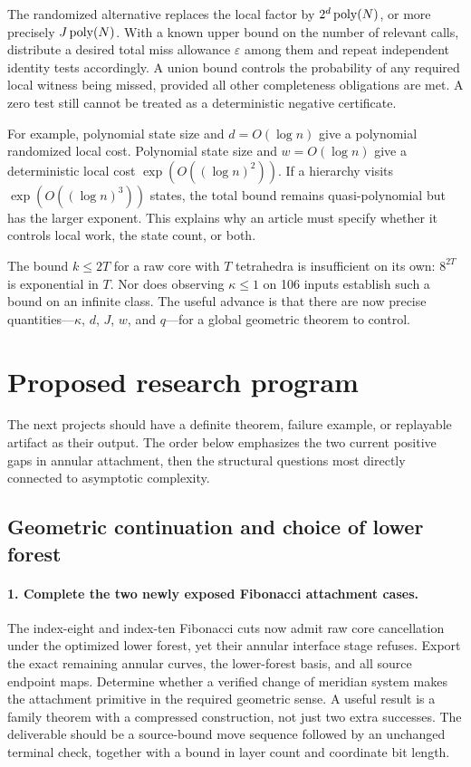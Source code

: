 The randomized alternative replaces the local factor by
$2^d\operatorname{poly}(N)$, or more precisely $J\operatorname{poly}(N)$.  With a known upper bound
on the number of relevant calls, distribute a desired total miss allowance
$\varepsilon$ among them and repeat independent identity tests accordingly.
A union bound controls the probability of any required local witness being
missed, provided all other completeness obligations are met.  A zero test
still cannot be treated as a deterministic negative certificate.

For example, polynomial state size and $d=O(\log n)$ give a polynomial
randomized local cost.  Polynomial state size and $w=O(\log n)$ give a
deterministic local cost $\exp(O((\log n)^2))$.  If a hierarchy visits
$\exp(O((\log n)^3))$ states, the total bound remains quasi-polynomial
but has the larger exponent.  This explains why an article must specify
whether it controls local work, the state count, or both.

The bound $k\leq2T$ for a raw core with $T$ tetrahedra is insufficient on
its own: $8^{2T}$ is exponential in $T$.  Nor does observing
$\kappa\leq1$ on 106 inputs establish such a bound on an infinite class.
The useful advance is that there are now precise quantities---$\kappa$,
$d$, $J$, $w$, and $q$---for a global geometric theorem to control.

\section{Proposed research program}
\label{sec:research}

The next projects should have a definite theorem, failure example, or
replayable artifact as their output.  The order below emphasizes the two
current positive gaps in annular attachment, then the structural questions
most directly connected to asymptotic complexity.

\subsection{Geometric continuation and choice of lower forest}

\paragraph{1. Complete the two newly exposed Fibonacci attachment cases.}
The index-eight and index-ten Fibonacci cuts now admit raw core
cancellation under the optimized lower forest, yet their annular interface
stage refuses.  Export the exact remaining annular curves, the lower-forest
basis, and all source endpoint maps.  Determine whether a verified change
of meridian system makes the attachment primitive in the required geometric
sense.  A useful result is a family theorem with a compressed construction,
not just two extra successes.  The deliverable should be a source-bound
move sequence followed by an unchanged terminal check, together with a
bound in layer count and coordinate bit length.


